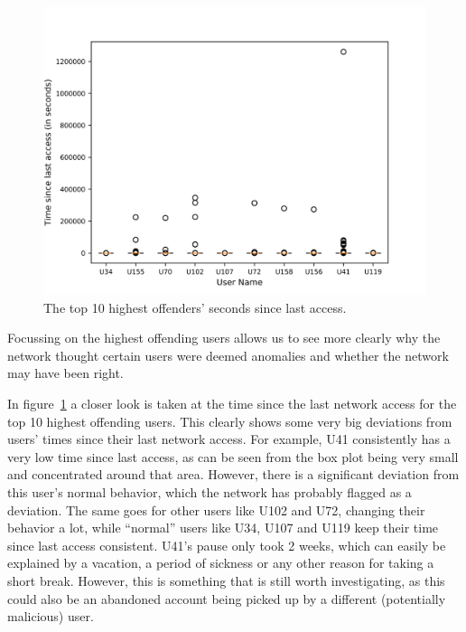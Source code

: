 \begin{figure}
	\begin{center}
		\includegraphics[scale=1.6]{results/highest_offender_time_since_last_access}
	\end{center}
	\caption{The top 10 highest offenders' seconds since last access.~\label{fig:time_since_last_access}}
\end{figure}

Focussing on the highest offending users allows us to see more clearly why the network thought certain users were deemed anomalies and whether the network may have been right.

In figure~\ref{fig:time_since_last_access} a closer look is taken at the time since the last network access for the top 10 highest offending users. This clearly shows some very big deviations from users' times since their last network access. For example, U41 consistently has a very low time since last access, as can be seen from the box plot being very small and concentrated around that area. However, there is a significant deviation from this user's normal behavior, which the network has probably flagged as a deviation. The same goes for other users like U102 and U72, changing their behavior a lot, while \enquote{normal} users like U34, U107 and U119 keep their time since last access consistent. U41's pause only took 2 weeks, which can easily be explained by a vacation, a period of sickness or any other reason for taking a short break. However, this is something that is still worth investigating, as this could also be an abandoned account being picked up by a different (potentially malicious) user.

